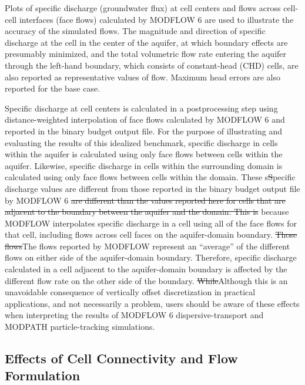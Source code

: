 \documentclass{article}
\begin{document}
Plots of specific discharge (groundwater flux) at cell centers and flows across cell-cell interfaces (face flows) calculated by MODFLOW 6 are used to illustrate the accuracy of the simulated flows. The magnitude and direction of specific discharge at the cell in the center of the aquifer, at which boundary effects are presumably minimized, and the total volumetric flow rate entering the aquifer through the left-hand boundary, which consists of constant-head (CHD) cells, are also reported as representative values of flow. Maximum head errors are also reported for the base case.

Specific discharge at cell centers is calculated in a postprocessing step using distance-weighted interpolation of face flows calculated by MODFLOW 6 and reported in the binary budget output file. For the purpose of illustrating and evaluating the results of this idealized benchmark, specific discharge in cells within the aquifer is calculated using only face flows between cells within the aquifer. Likewise, specific discharge in cells within the surrounding domain is calculated using only face flows between cells within the domain. {\color{red} These s\sout{S}}pecific discharge values {\color{red} are different from those} reported in the binary budget output file by MODFLOW 6 {\color{red} \sout{are different than the values reported here for cells that are adjacent to the boundary between the aquifer and the domain. This is }}because MODFLOW interpolates specific discharge in a cell using all of the face flows for that cell, including flows across cell faces on the aquifer-domain boundary. {\color{red} \sout{Those flows}The flows reported by MODFLOW} represent an ``average'' of the different flows on either side of the aquifer-domain boundary. Therefore, specific discharge calculated in a cell adjacent to the aquifer-domain boundary is affected by the different flow rate on the other side of the boundary. {\color{red} \sout{While}Although} this is an unavoidable consequence of vertically offset discretization in practical applications, and not necessarily a problem, users should be aware of these effects when interpreting the results of MODFLOW 6 dispersive-transport and MODPATH particle-tracking simulations.

\subsection*{Effects of Cell Connectivity and Flow Formulation}
\end{document}
